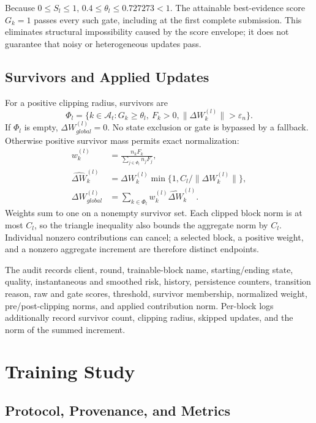 \documentclass[conference,compsoc]{IEEEtran}
\begin{document}
Because $0\le S_l\le1$, $0.4\le\theta_l\le0.727273<1$. The attainable
best-evidence score $G_k=1$ passes every such gate, including at the first
complete submission. This eliminates structural impossibility caused by the
score envelope; it does not guarantee that noisy or heterogeneous updates pass.

\subsection{Survivors and Applied Updates}

For a positive clipping radius, survivors are
\begin{equation}
    \Phi_l=\{k\in\mathcal A_t:G_k\ge\theta_l,\ F_k>0,
    \|\Delta W_k^{(l)}\|>\varepsilon_n\}.
\end{equation}
If $\Phi_l$ is empty, $\Delta W_{global}^{(l)}=0$. No state exclusion or gate
is bypassed by a fallback. Otherwise positive survivor mass permits exact
normalization:
\begin{align}
    w_k^{(l)}                  & =\frac{n_k F_k}{\sum_{j\in\Phi_l}n_j F_j},             \\
    \widehat{\Delta W}_k^{(l)} & =\Delta W_k^{(l)}
    \min\{1,C_l/\|\Delta W_k^{(l)}\|\},                                                 \\
    \Delta W_{global}^{(l)}    & =\sum_{k\in\Phi_l}w_k^{(l)}\widehat{\Delta W}_k^{(l)}.
\end{align}
Weights sum to one on a nonempty survivor set. Each clipped block norm is at
most $C_l$, so the triangle inequality also bounds the aggregate norm by $C_l$.
Individual nonzero contributions can cancel; a selected block, a positive
weight, and a nonzero aggregate increment are therefore distinct endpoints.

The audit records client, round, trainable-block name, starting/ending state,
quality, instantaneous and smoothed risk, history, persistence counters,
transition reason, raw and gate scores, threshold, survivor membership,
normalized weight, pre/post-clipping norms, and applied contribution norm.
Per-block logs additionally record survivor count, clipping radius, skipped
updates, and the norm of the summed increment.

\section{Training Study}
\label{sec:original_study}

\subsection{Protocol, Provenance, and Metrics}
\end{document}
